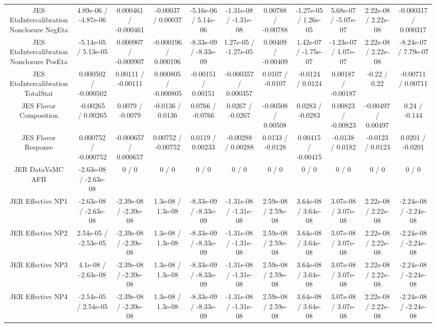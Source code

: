 \begin{table}[htbp]
\begin{center}
\begin{tabular}{|c|c|c|c|c|c|c|c|c|c|c|}
  JES EtaIntercalibration Nonclosure NegEta & 4.89e-06 / -4.87e-06 & 0.000461 / -0.000461 & -0.00037 / 0.00037 & -5.16e-06 / 5.14e-06 & -1.31e-08 / -1.31e-08 & 0.00788 / -0.00788 & -1.27e-05 / 1.26e-05 & 5.68e-07 / -5.07e-07 & 2.22e-08 / 2.22e-08 & -0.000317 / 0.000317 \\ 
  JES EtaIntercalibration Nonclosure PosEta & -5.14e-05 / 5.13e-05 & 0.000907 / -0.000907 & -0.000196 / 0.000196 & -8.33e-09 / -8.33e-09 & 1.27e-05 / -1.27e-05 & 0.00409 / -0.00409 & 1.42e-07 / -1.75e-07 & -1.23e-07 / 1.07e-07 & 2.22e-08 / 2.22e-08 & -8.24e-07 / 7.79e-07 \\ 
  JES EtaIntercalibration TotalStat & 0.000502 / -0.000502 & 0.00111 / -0.00111 & 0.000805 / -0.000805 & -0.00151 / 0.00151 & -0.000357 / 0.000357 & 0.0107 / -0.0107 & -0.0124 / 0.0124 & 0.00187 / -0.00187 & -0.22 / 0.22 & -0.00711 / 0.00711 \\ 
  JES Flavor Composition & -0.00265 / 0.00265 & 0.0079 / -0.0079 & -0.0136 / 0.0136 & 0.0766 / -0.0766 & 0.0267 / -0.0267 & -0.00508 / 0.00508 & 0.0283 / -0.0283 & 0.00823 / -0.00823 & -0.00497 / 0.00497 & 0.24 / -0.144 \\ 
  JES Flavor Response & 0.000752 / -0.000752 & -0.000657 / 0.000657 & 0.00752 / -0.00752 & 0.0119 / 0.00233 & -0.00288 / 0.00288 & 0.0133 / -0.0128 & 0.00415 / -0.00415 & -0.0138 / 0.0182 & -0.0123 / 0.0123 & 0.0201 / -0.0201 \\ 
  JER DataVsMC AFII & -2.63e-08 / -2.63e-08 & 0 / 0 & 0 / 0 & 0 / 0 & 0 / 0 & 0 / 0 & 0 / 0 & 0 / 0 & 0 / 0 & 0 / 0 \\ 
  JER Effective NP1 & -2.63e-08 / -2.63e-08 & -2.39e-08 / -2.39e-08 & 1.3e-08 / 1.3e-08 & -8.33e-09 / -8.33e-09 & -1.31e-08 / -1.31e-08 & 2.59e-08 / 2.59e-08 & 3.64e-08 / 3.64e-08 & 3.07e-08 / 3.07e-08 & 2.22e-08 / 2.22e-08 & -2.24e-08 / -2.24e-08 \\ 
  JER Effective NP2 & 2.54e-05 / -2.53e-05 & -2.39e-08 / -2.39e-08 & 1.3e-08 / 1.3e-08 & -8.33e-09 / -8.33e-09 & -1.31e-08 / -1.31e-08 & 2.59e-08 / 2.59e-08 & 3.64e-08 / 3.64e-08 & 3.07e-08 / 3.07e-08 & 2.22e-08 / 2.22e-08 & -2.24e-08 / -2.24e-08 \\ 
  JER Effective NP3 & 4.1e-08 / -2.63e-08 & -2.39e-08 / -2.39e-08 & 1.3e-08 / 1.3e-08 & -8.33e-09 / -8.33e-09 & -1.31e-08 / -1.31e-08 & 2.59e-08 / 2.59e-08 & 3.64e-08 / 3.64e-08 & 3.07e-08 / 3.07e-08 & 2.22e-08 / 2.22e-08 & -2.24e-08 / -2.24e-08 \\ 
  JER Effective NP4 & -2.54e-05 / 2.54e-05 & -2.39e-08 / -2.39e-08 & 1.3e-08 / 1.3e-08 & -8.33e-09 / -8.33e-09 & -1.31e-08 / -1.31e-08 & 2.59e-08 / 2.59e-08 & 3.64e-08 / 3.64e-08 & 3.07e-08 / 3.07e-08 & 2.22e-08 / 2.22e-08 & -2.24e-08 / -2.24e-08 \\ 

\end{tabular}
\end{center}
\end{table}
